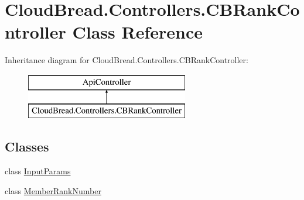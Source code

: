 \hypertarget{a00029}{}\section{Cloud\+Bread.\+Controllers.\+C\+B\+Rank\+Controller Class Reference}
\label{a00029}
Inheritance diagram for Cloud\+Bread.\+Controllers.\+C\+B\+Rank\+Controller\+:\begin{figure}[H]
\begin{center}
\leavevmode
\includegraphics[height=2.000000cm]{a00029}
\end{center}
\end{figure}
\subsection*{Classes}
\begin{DoxyCompactItemize}
\item 
class \hyperlink{a00076}{Input\+Params}
\item 
class \hyperlink{a00079}{Member\+Rank\+Number}
\end{DoxyCompactItemize}
